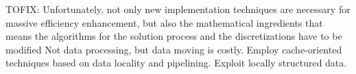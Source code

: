 TOFIX: Unfortunately, not only new implementation techniques are necessary for massive efficiency enhancement, but also the mathematical ingredients that means the algorithms for the solution process and the discretizations have to be modified
Not data processing, but data moving is costly. Employ cache-oriented techniques based on data locality and pipelining. Exploit locally structured data.

